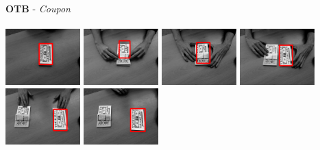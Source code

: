 \documentclass[10pt,twocolumn,letterpaper,french]{article}
\begin{document}
\begin{appendices}
\begin{center}
  \textbf{OTB} - \textit{Coupon}\\
  \hspace{1cm}\\
  \includegraphics[width=82pt, cfbox=green 1pt 1pt]{images/exemples/bof/coupon/000001.png}
  \includegraphics[width=82pt, cfbox=green 1pt 1pt]{images/exemples/bof/coupon/000054.png}
  \includegraphics[width=82pt, cfbox=green 1pt 1pt]{images/exemples/bof/coupon/000104.png}
  \includegraphics[width=82pt, cfbox=red 1pt 1pt]{images/exemples/bof/coupon/000133.png}
  \includegraphics[width=82pt, cfbox=red 1pt 1pt]{images/exemples/bof/coupon/000215.png}
  \includegraphics[width=82pt, cfbox=red 1pt 1pt]{images/exemples/bof/coupon/000322.png}\\
  \hspace{1cm}\\
  \hspace{1cm}\\


\end{center}
\end{appendices}
\end{document}

